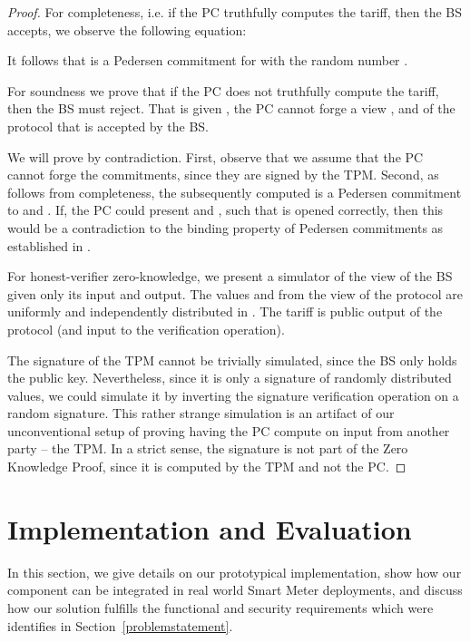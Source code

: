 \documentclass[english]{llncs}
\begin{document}
\begin{proof}
For completeness, i.e. if the PC truthfully computes the tariff, then the BS accepts, we observe the following equation:



It follows that  is a Pedersen commitment for  with the random number .

For soundness we prove that if the PC does not truthfully compute the tariff, then the BS must reject.
That is given , the PC cannot forge a view ,  and  of the protocol that is accepted by the BS.

We will prove by contradiction.
First, observe that we assume that the PC cannot forge the  commitments, since they are signed by the TPM.
Second, as follows from completeness, the subsequently computed  is a Pedersen commitment to  and .
If, the PC could present  and , such that  is opened correctly, then this would be a contradiction to the binding property of Pedersen commitments as established in \cite{Ped}.

For honest-verifier zero-knowledge, we present a simulator of the view of the BS given only its input and output.
The values  and  from the view of the protocol are uniformly and independently distributed in .
The tariff  is public output of the protocol (and input to the verification operation).

The signature  of the TPM cannot be trivially simulated, since the BS only holds the public key.
Nevertheless, since it is only a signature of randomly distributed values, we could simulate it by inverting the signature verification operation on a random signature.
This rather strange simulation is an artifact of our unconventional setup of proving having the PC compute on input from another party -- the TPM.
In a strict sense, the signature is not part of the Zero Knowledge Proof, since it is computed by the TPM and not the PC.

\end{proof}


\section{Implementation and Evaluation}
\label{evaluation}

In this section, we give details on our prototypical implementation, show how our component can be integrated in real world Smart Meter deployments, and discuss how our solution fulfills the functional and security requirements which were identifies in Section~\ref{problemstatement}. 
\end{document}
